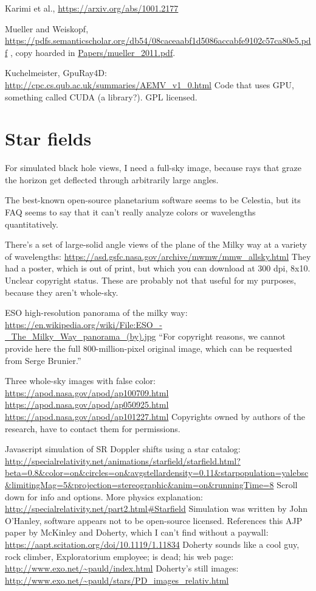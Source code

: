 \documentclass{article}
\begin{document}
Karimi et al., \url{https://arxiv.org/abs/1001.2177}

Mueller and Weiskopf, \url{https://pdfs.semanticscholar.org/db54/08caceaabf1d5086accabfe9102c57ca80e5.pdf} ,
copy hoarded in \url{Papers/mueller_2011.pdf}.

Kuchelmeister, GpuRay4D: \url{http://cpc.cs.qub.ac.uk/summaries/AEMV_v1_0.html}
Code that uses GPU, something called CUDA (a library?). GPL licensed.

\section{Star fields}

For simulated black hole views, I need a full-sky image, because rays that graze the horizon
get deflected through arbitrarily large angles.

The best-known open-source planetarium software seems to be Celestia, but its FAQ
seems to say that it can't really analyze colors or wavelengths quantitatively.

There's a set of large-solid angle views of the plane of the Milky way at a variety
of wavelengths: \url{https://asd.gsfc.nasa.gov/archive/mwmw/mmw_allsky.html} They had
a poster, which is out of print, but which you can download at 300 dpi, 8x10. Unclear
copyright status. These are probably not that useful for my purposes, because they
aren't whole-sky.

ESO high-resolution panorama of the milky way:
\url{https://en.wikipedia.org/wiki/File:ESO_-_The_Milky_Way_panorama_(by).jpg}
``For copyright reasons, we cannot provide here the full 800-million-pixel original image, which can be requested from Serge Brunier.''

Three whole-sky images with false color:
\url{https://apod.nasa.gov/apod/ap100709.html}
\url{https://apod.nasa.gov/apod/ap050925.html}
\url{https://apod.nasa.gov/apod/ap101227.html}
Copyrights owned by authors of the research, have to contact them for permissions.

Javascript simulation of SR Doppler shifts using a star catalog:
\url{http://specialrelativity.net/animations/starfield/starfield.html?beta=0.8&color=on&circles=on&avgstellardensity=0.11&starpopulation=yalebsc&limitingMag=5&projection=stereographic&anim=on&runningTime=8}
Scroll down for info and options.
More physics explanation: \url{http://specialrelativity.net/part2.html#Starfield}
Simulation was written by John O'Hanley, software appears not to be open-source licensed.
References this AJP paper by McKinley and Doherty, which I can't find without a paywall:
\url{https://aapt.scitation.org/doi/10.1119/1.11834} Doherty sounds like a cool guy, rock
climber, Exploratorium employee; is dead; his web page: \url{http://www.exo.net/~pauld/index.html}
Doherty's still images: \url{http://www.exo.net/~pauld/stars/PD_images_relativ.html}
\end{document}
